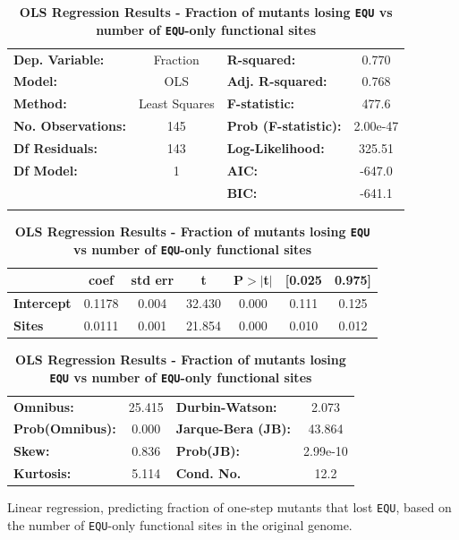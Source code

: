 \documentclass[10pt,letterpaper,final]{article}
\begin{document}
	\begin{table}[h]
	\centering
	\caption{\textbf{OLS Regression Results - Fraction of mutants losing \texttt{EQU} vs number of \texttt{EQU}-only functional sites}}
	\label{ce-olsregression-1step-EQU-h}
	\begin{tabular}{lclc}
	\toprule
	\textbf{Dep. Variable:}    &     Fraction     & \textbf{  R-squared:         } &     0.770   \\
	\textbf{Model:}            &       OLS        & \textbf{  Adj. R-squared:    } &     0.768   \\
	\textbf{Method:}           &  Least Squares   & \textbf{  F-statistic:       } &     477.6   \\
	\textbf{No. Observations:} &         145      & \textbf{  Prob (F-statistic):} &  2.00e-47   \\
	\textbf{Df Residuals:}     &         143      & \textbf{  Log-Likelihood:    } &    325.51   \\
	\textbf{Df Model:}         &           1      & \textbf{  AIC:               } &    -647.0   \\
	 & & \textbf{  BIC:               } &    -641.1   \\
	 & & \textbf{                     } &             \\
	\bottomrule
	\end{tabular}
	\begin{tabular}{lcccccc}
	                   & \textbf{coef} & \textbf{std err} & \textbf{t} & \textbf{P$>$$|$t$|$} & \textbf{[0.025} & \textbf{0.975]}  \\
	\midrule
	\textbf{Intercept} &       0.1178  &        0.004     &    32.430  &         0.000        &        0.111    &        0.125     \\
	\textbf{Sites}     &       0.0111  &        0.001     &    21.854  &         0.000        &        0.010    &        0.012     \\
	\bottomrule
	\end{tabular}
	\begin{tabular}{lclc}
	\textbf{Omnibus:}       & 25.415 & \textbf{  Durbin-Watson:     } &    2.073  \\
	\textbf{Prob(Omnibus):} &  0.000 & \textbf{  Jarque-Bera (JB):  } &   43.864  \\
	\textbf{Skew:}          &  0.836 & \textbf{  Prob(JB):          } & 2.99e-10  \\
	\textbf{Kurtosis:}      &  5.114 & \textbf{  Cond. No.          } &     12.2  \\
	\bottomrule
	\end{tabular}
	\begin{flushleft}Linear regression, predicting fraction of one-step mutants that lost \texttt{EQU}, based on the number of \texttt{EQU}-only functional sites in the original genome.  
	\end{flushleft}
	\label{ce-olsregression-1step-EQU}
	\end{table}
\end{document}
